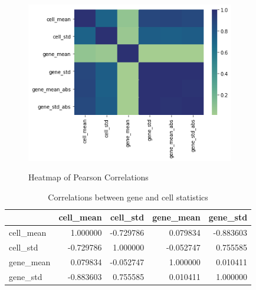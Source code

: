 \documentclass[bsc,frontabs,twoside,singlespacing,parskip,deptreport]{infthesis}     %
\begin{document}
\begin{figure}[h!]
\centering
\caption{Heatmap of Pearson Correlations}
\includegraphics[height=7cm]{images/gene_cell_corr.png}\label{corr_map}
\end{figure}
\begin{table}[h!]
\centering
\begin{tabular}{lrrrr}
\toprule
{} &  cell\_mean &  cell\_std &  gene\_mean &  gene\_std \\
\midrule
cell\_mean &   1.000000 & -0.729786 &   0.079834 & -0.883603 \\
cell\_std  &  -0.729786 &  1.000000 &  -0.052747 &  0.755585 \\
gene\_mean &   0.079834 & -0.052747 &   1.000000 &  0.010411 \\
gene\_std  &  -0.883603 &  0.755585 &   0.010411 &  1.000000 \\
\bottomrule
\end{tabular}
\caption{Correlations between gene and cell statistics}\label{cell_gene_corr_table}
\end{table}
\end{document}
